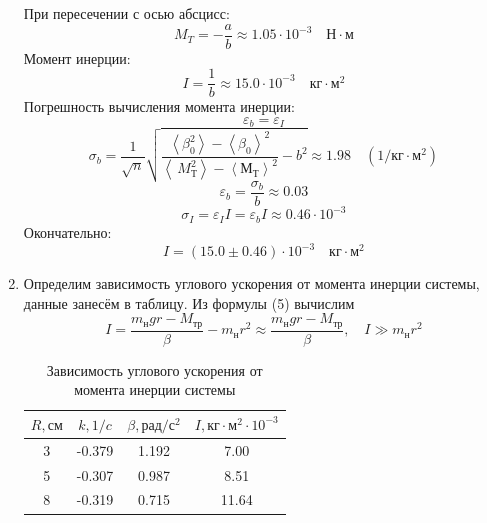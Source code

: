 \documentclass[a4paper,12pt]{article}
\begin{document}
\begin{enumerate}
    При пересечении с осью абсцисс:
    \begin{displaymath}
        M_T = -\frac{a}{b} \approx 1.05 \cdot 10^{-3} \quad Н \cdot м
    \end{displaymath}
    Момент инерции:
    \begin{displaymath}
        I = \frac{1}{b} \approx 15.0 \cdot 10^{-3} \quad кг \cdot м^2
    \end{displaymath}
    Погрешность вычисления момента инерции:
    \begin{displaymath}
        \varepsilon_b = \varepsilon_I
    \end{displaymath}
    \begin{displaymath}
        \sigma_b = \dfrac{1}{\sqrt{n}}\sqrt{\dfrac{\left\langle \beta_0^2\right\rangle - \left\langle \beta_0\right\rangle^2}{\left\langle \
		M_Т^2\right\rangle - \left\langle М_Т\right\rangle^2} - b^2} \approx 1.98 \quad (1/кг\cdot м^2)
    \end{displaymath}
    \begin{displaymath}
        \varepsilon_b = \frac{\sigma_b}{b} \approx 0.03
    \end{displaymath}
    \begin{displaymath}
        \sigma_I = \varepsilon_I I = \varepsilon_b I \approx 0.46 \cdot 10^{-3}
    \end{displaymath}
    Окончательно:
    \begin{displaymath}
        I = (15.0 \pm 0.46) \cdot 10^{-3} \quad кг \cdot м^2
    \end{displaymath}
    \item Определим зависимость углового ускорения от момента инерции системы, данные занесём в таблицу. Из формулы (5) вычислим
    \begin{displaymath}
        I  = \dfrac{m_нgr - M_{тр}}{\beta}  - m_н r^2 \approx \dfrac{m_нgr - M_{тр}}{\beta}, \quad I \gg m_н r^2
    \end{displaymath}
    \begin{table}[h]
        \centering
        \begin{tabular}{|c|c|c|c|}
            \hline
            $R, см$ & $k, 1/c$ & $\beta, рад/с^2$ & $I, кг\cdot м^2 \cdot 10^{-3}$ \\ 
            \hline
            3 & -0.379 & 1.192 & 7.00\\
            5 & -0.307 & 0.987 & 8.51\\
            8 & -0.319 & 0.715 & 11.64\\
            \hline
        \end{tabular}
        \caption{Зависимость углового ускорения от момента инерции системы}
    \end{table}
    

\end{enumerate}
\end{document}
